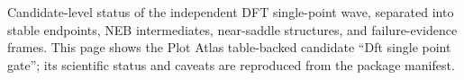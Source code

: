 Candidate-level status of the independent DFT single-point wave, separated into stable endpoints, NEB intermediates, near-saddle structures, and failure-evidence frames. This page shows the Plot Atlas table-backed candidate ``Dft single point gate''; its scientific status and caveats are reproduced from the package manifest.
